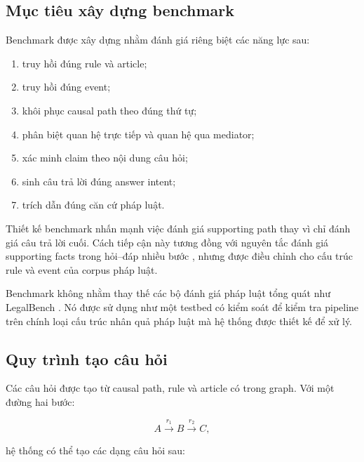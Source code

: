 \subsection{Mục tiêu xây dựng benchmark}

Benchmark được xây dựng nhằm đánh giá riêng biệt các năng lực sau:

\begin{enumerate}
    \item truy hồi đúng rule và article;
    \item truy hồi đúng event;
    \item khôi phục causal path theo đúng thứ tự;
    \item phân biệt quan hệ trực tiếp và quan hệ qua mediator;
    \item xác minh claim theo nội dung câu hỏi;
    \item sinh câu trả lời đúng answer intent;
    \item trích dẫn đúng căn cứ pháp luật.
\end{enumerate}

Thiết kế benchmark nhấn mạnh việc đánh giá supporting path thay vì chỉ đánh
giá câu trả lời cuối. Cách tiếp cận này tương đồng với nguyên tắc đánh giá
supporting facts trong hỏi--đáp nhiều bước
\cite{yang2018hotpotqa}, nhưng được điều chỉnh cho cấu trúc rule và event
của corpus pháp luật.

Benchmark không nhằm thay thế các bộ đánh giá pháp luật tổng quát như
LegalBench \cite{guha2023legalbench}. Nó được sử dụng như một testbed có
kiểm soát để kiểm tra pipeline trên chính loại cấu trúc nhân quả pháp luật
mà hệ thống được thiết kế để xử lý.

\subsection{Quy trình tạo câu hỏi}

Các câu hỏi được tạo từ causal path, rule và article có trong graph. Với một
đường hai bước:

\[
A \xrightarrow{r_1} B \xrightarrow{r_2} C,
\]

hệ thống có thể tạo các dạng câu hỏi sau:

